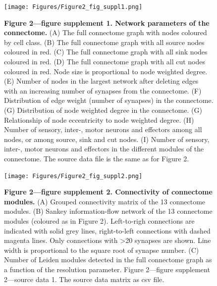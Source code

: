 \documentclass[
  11pt,
]{article}
\begin{document}
\begin{figure}[H]

{\centering \texttt{[image: Figures/Figure2\_fig\_suppl1.png]}

}

\caption{\textbf{Figure 2---figure supplement 1. Network parameters of
the connectome.} (A) The full connectome graph with nodes coloured by
cell class. (B) The full connectome graph with all source nodes coloured
in red. (C) The full connectome graph with all sink nodes coloured in
red. (D) The full connectome graph with all cut nodes coloured in red.
Node size is proportional to node weighted degree. (E) Number of nodes
in the largest network after deleting edges with an increasing number of
synapses from the connectome. (F) Distribution of edge weight (number of
synapses) in the connectome. (G) Distribution of node weighted degree in
the connectome. (G) Relationship of node eccentricity to node weighted
degree. (H) Number of sensory, inter-, motor neurons and effectors among
all nodes, or among source, sink and cut nodes. (I) Number of sensory,
inter-, motor neurons and effectors in the different modules of the
connectome. The source data file is the same as for Figure 2.}

\end{figure}%

\begin{figure}[H]

{\centering \texttt{[image: Figures/Figure2\_fig\_suppl2.png]}

}

\caption{\textbf{Figure 2---figure supplement 2. Connectivity of
connectome modules.} (A) Grouped connectivity matrix of the 13
connectome modules. (B) Sankey information-flow network of the 13
connectome modules (coloured as in Figure 2). Left-to-righ connections
are indicated with solid grey lines, right-to-left connections with
dashed magenta lines. Only connections with \textgreater20 synapses are
shown. Line width is proportional to the square root of synapse number.
(C) Number of Leiden modules detected in the full connectome graph as a
function of the resolution parameter. Figure 2---figure supplement
2---source data 1. The source data matrix as csv file.}

\end{figure}%
\end{document}
